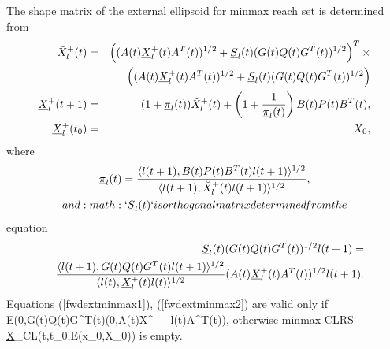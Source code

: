 \documentclass[letterpaper,10pt,english]{sphinxmanual}
\begin{document}
The shape matrix of the external ellipsoid for minmax reach set is
determined from
\begin{gather}
\begin{split}\begin{aligned}
\breve{X}^+_l(t) & = &
\left((A(t)\underline{X}^+_l(t)A^T(t))^{1/2} +
\underline{S}_l(t)(G(t)Q(t)G^T(t))^{1/2}\right)^T
\times \nonumber \\
& &\left((A(t)\underline{X}^+_l(t)A^T(t))^{1/2} +
\underline{S}_l(t)(G(t)Q(t)G^T(t))^{1/2}\right)
\label{fwdextminmax1}\\
\underline{X}^+_l(t+1) & = &
(1+\underline{\pi}_l(t))\breve{X}^+_l(t) +
\left(1+\frac{1}{\underline{\pi}_l(t)}\right)
B(t)P(t)B^T(t), \label{fwdextminmax2} \\
\underline{X}^+_l(t_0) & = & X_0, \label{fwdextminmax3}\end{aligned}\end{split}\notag
\end{gather}
where
\begin{gather}
\begin{split}  \underline{\pi}_l(t) = \frac{\langle l(t+1),
  B(t)P(t)B^T(t)l(t+1)\rangle^{1/2}}{\langle l(t+1),
  \breve{X}^+_l(t)l(t+1)\rangle^{1/2}},\end{split}\notag\\\begin{split}and :math:`\underline{S}_l(t)` is orthogonal matrix determined from the\end{split}\notag
\end{gather}
equation
\begin{gather}
\begin{split}\begin{aligned}
& & \underline{S}_l(t)(G(t)Q(t)G^T(t))^{1/2}l(t+1) = \\
& & \frac{\langle l(t+1),
G(t)Q(t)G^T(t)l(t+1)\rangle^{1/2}}{\langle l(t),
\underline{X}^+_l(t)l(t)\rangle^{1/2}}(A(t)\underline{X}^+_l(t)A^T(t))^{1/2}l(t+1).\end{aligned}\end{split}\notag
\end{gather}
Equations ({[}fwdextminmax1{]}), ({[}fwdextminmax2{]}) are valid only if
{\mathcal E}(0,G(t)Q(t)G^T(t)(0,A(t)\underline{X}^+_l(t)A^T(t)),
otherwise minmax CLRS
\underline{{\mathcal X}}_{CL}(t,t_0,{\mathcal E}(x_0,X_0)) is
empty.
\end{document}

